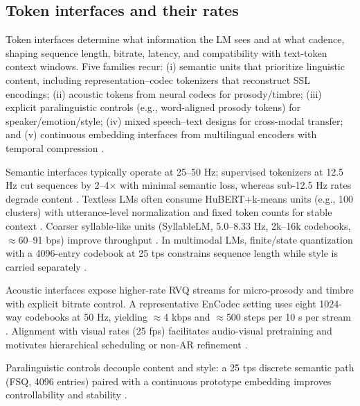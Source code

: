 \documentclass{article}
\begin{document}
\subsection{Token interfaces and their rates} \label{subsec:tokeninterfacesandtheirrates}
Token interfaces determine what information the LM sees and at what cadence, shaping sequence length, bitrate, latency, and compatibility with text-token context windows. Five families recur: (i) semantic units that prioritize linguistic content, including representation--codec tokenizers that reconstruct SSL encodings; (ii) acoustic tokens from neural codecs for prosody/timbre; (iii) explicit paralinguistic controls (e.g., word-aligned prosody tokens) for speaker/emotion/style; (iv) mixed speech--text designs for cross-modal transfer; and (v) continuous embedding interfaces from multilingual encoders with temporal compression \cite{qian2025prosodylmuncoveringemergingprosodyproces,fily2024establishingdegreesclosenessbetweenaudio,entry2025towardjointlanguagemodelingspeechunitste,huang2024repcodecspeechrepresentationcodectokeniz}.

Semantic interfaces typically operate at 25--50 Hz; supervised tokenizers at 12.5 Hz cut sequences by 2--4$\times$ with minimal semantic loss, whereas sub-12.5 Hz rates degrade content \cite{zeng2024scalingspeechtextpretrainingsyntheticint}. Textless LMs often consume HuBERT+k-means units (e.g., 100 clusters) with utterance-level normalization and fixed token counts for stable context \cite{hsu2024exploringcontextlearningtextlessspeechla}. Coarser syllable-like units (SyllableLM, 5.0--8.33 Hz, 2k--16k codebooks, $\approx$60--91 bps) improve throughput \cite{baade2024syllablelmlearningcoarsesemanticunitsspe}. In multimodal LMs, finite/state quantization with a 4096-entry codebook at 25 tps constrains sequence length while style is carried separately \cite{chen2025emovaempoweringlanguagemodelsseehearspea}.

Acoustic interfaces expose higher-rate RVQ streams for micro-prosody and timbre with explicit bitrate control. A representative EnCodec setting uses eight 1024-way codebooks at 50 Hz, yielding $\approx$4 kbps and $\approx$500 steps per 10 s per stream \cite{peng2024mslms2stmultitaskspeechlanguagemodeltext}. Alignment with visual rates (25 fps) facilitates audio-visual pretraining and motivates hierarchical scheduling or non-AR refinement \cite{sadok2025vectorquantizedmaskedautoencoderaudiovis,peng2024mslms2stmultitaskspeechlanguagemodeltext}.

Paralinguistic controls decouple content and style: a 25 tps discrete semantic path (FSQ, 4096 entries) paired with a continuous prototype embedding improves controllability and stability \cite{chen2025emovaempoweringlanguagemodelsseehearspea}.
\end{document}
